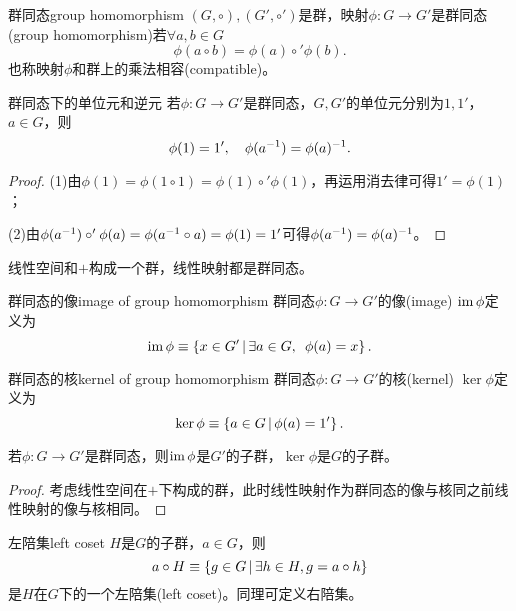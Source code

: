 \begin{definition}{群同态}{group homomorphism}
	$(G,\circ),(G',\circ')$是群，映射$\phi:G\to G'$是群同态(group homomorphism)若$\forall a,b\in G$
	\begin{equation}
		\phi(a\circ b)=\phi(a)\circ'\phi(b).
	\end{equation}
	也称映射$\phi$和群上的乘法相容(compatible)。
\end{definition}
\begin{theorem}{群同态下的单位元和逆元}{}
	若$\phi:G\to G'$是群同态，$G,G'$的单位元分别为$1,1'$，$a\in G$，则
	\begin{equation}
		\phi(1)=1',\quad \phi(a^{-1})=\phi(a)^{-1}.
	\end{equation}
\end{theorem}
\begin{proof}
	(1)由$\phi(1)=\phi(1\circ 1)=\phi(1)\circ'\phi(1)$，再运用消去律可得$1'=\phi(1)$；

	(2)由$\phi(a^{-1})\circ'\phi(a)=\phi(a^{-1}\circ a)=\phi(1)=1'$可得$\phi(a^{-1})=\phi(a)^{-1}$。
\end{proof}
\begin{example}
	线性空间和$+$构成一个群，线性映射都是群同态。
\end{example}
\begin{definition}{群同态的像}{image of group homomorphism}
	群同态$\phi:G\to G'$的像(image) $\operatorname{im}\phi$定义为
	\begin{equation}
		\operatorname{im}\phi\equiv\left\{x\in G'\,\middle\vert\,\exists a\in G,\enspace\phi(a)=x\right\}.
	\end{equation}
\end{definition}
\begin{definition}{群同态的核}{kernel of group homomorphism}
	群同态$\phi:G\to G'$的核(kernel) $\ker\phi$定义为
	\begin{equation}
		\ker\phi\equiv\left\{a\in G\,\middle\vert\,\phi(a)=1'\right\}.
	\end{equation}
\end{definition}
\begin{theorem}{}{}
	若$\phi:G\to G'$是群同态，则$\operatorname{im}\phi$是$G'$的子群，$\ker\phi$是$G$的子群。
\end{theorem}
\begin{proof}
	考虑线性空间在$+$下构成的群，此时线性映射作为群同态的像与核同之前线性映射的像与核相同。
\end{proof}
\begin{definition}{左陪集}{left coset}
	$H$是$G$的子群，$a\in G$，则
	\begin{equation}
		a\circ H\equiv\left\{g\in G\,\middle\vert\,\exists h\in H,g=a\circ h\right\}
	\end{equation}
	是$H$在$G$下的一个左陪集(left coset)。同理可定义右陪集。
\end{definition}
